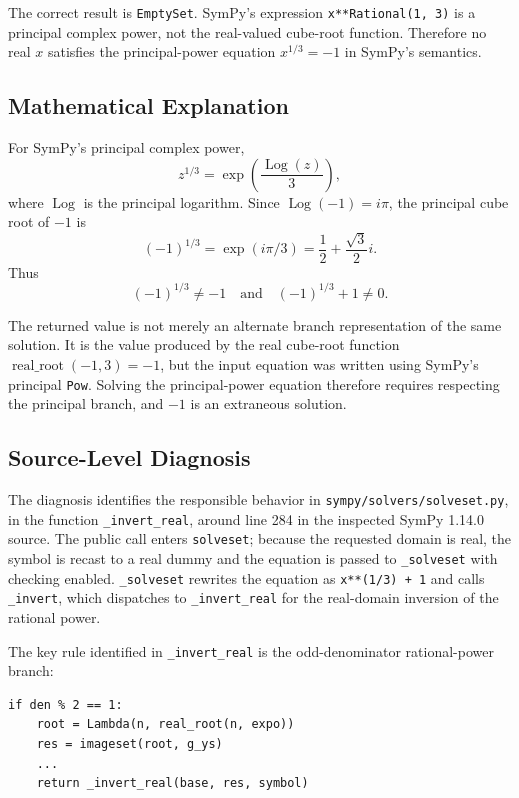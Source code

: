 \documentclass[11pt]{article}
\begin{document}
The correct result is \texttt{EmptySet}.  SymPy's expression
\texttt{x**Rational(1, 3)} is a principal complex power, not the real-valued
cube-root function.  Therefore no real \(x\) satisfies the principal-power
equation \(x^{1/3}=-1\) in SymPy's semantics.

\subsection{Mathematical Explanation}

For SymPy's principal complex power,
\[
z^{1/3}=\exp\!\left(\frac{\operatorname{Log}(z)}{3}\right),
\]
where \(\operatorname{Log}\) is the principal logarithm.  Since
\(\operatorname{Log}(-1)=i\pi\), the principal cube root of \(-1\) is
\[
(-1)^{1/3}=\exp(i\pi/3)=\frac{1}{2}+\frac{\sqrt{3}}{2}i.
\]
Thus
\[
(-1)^{1/3}\ne -1
\quad\text{and}\quad
(-1)^{1/3}+1\ne0.
\]

The returned value is not merely an alternate branch representation of the same
solution.  It is the value produced by the real cube-root function
\(\operatorname{real\_root}(-1,3)=-1\), but the input equation was written using
SymPy's principal \texttt{Pow}.  Solving the principal-power equation therefore
requires respecting the principal branch, and \(-1\) is an extraneous solution.

\subsection{Source-Level Diagnosis}

The diagnosis identifies the responsible behavior in
\nolinkurl{sympy/solvers/solveset.py}, in the function
\texttt{\_invert\_real}, around line 284 in the inspected SymPy 1.14.0 source.
The public call enters \texttt{solveset}; because the requested domain is real,
the symbol is recast to a real dummy and the equation is passed to
\texttt{\_solveset} with checking enabled.  \texttt{\_solveset} rewrites the
equation as \texttt{x**(1/3) + 1} and calls \texttt{\_invert}, which dispatches
to \texttt{\_invert\_real} for the real-domain inversion of the rational power.

The key rule identified in \texttt{\_invert\_real} is the odd-denominator
rational-power branch:

\begin{lstlisting}[style=bugpython]
if den % 2 == 1:
    root = Lambda(n, real_root(n, expo))
    res = imageset(root, g_ys)
    ...
    return _invert_real(base, res, symbol)
\end{lstlisting}
\end{document}
